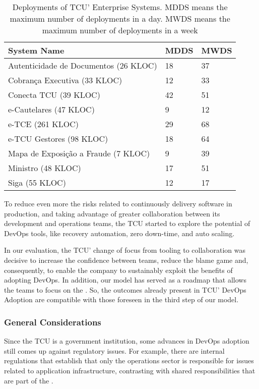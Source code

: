 \begin{table}[hb!]
  \centering
  \begin{small}
\begin{tabular}{p{7cm}p{3cm}p{3cm}} \toprule
{\bf System Name} & {\bf MDDS} & {\bf MWDS} \\ \midrule
Autenticidade de Documentos (26 KLOC) & 18 & 37 \\ 
Cobrança Executiva (33 KLOC) & 12 & 33 \\ 
Conecta TCU (39 KLOC) & 42 & 51 \\ 
e-Cautelares (47 KLOC) & 9 & 12 \\ 
e-TCE (261 KLOC) & 29 & 68 \\ 
e-TCU Gestores (98 KLOC) & 18 & 64 \\ 
Mapa de Exposi\c{c}\~{a}o a Fraude (7 KLOC) & 9 & 39 \\ 
Ministro (48 KLOC) & 17 & 51 \\ 
Siga (55 KLOC) & 12 & 17 \\ \bottomrule
\end{tabular}
\end{small}
  \caption{Deployments of TCU' Enterprise Systems. MDDS means the maximum
    number of deployments in a day. MWDS means the maximum number of deployments
  in a week}
\label{deployments_table}
\end{table}

To reduce even more the risks related to continuously delivery software in
production, and taking advantage of greater collaboration between its development
and operations teams, the TCU started to explore the potential of DevOps tools,
like recovery automation, zero down-time, and auto scaling.

In our evaluation, the TCU' change of focus from tooling to collaboration was
decisive to increase the confidence between teams, reduce the blame game and,
consequently, to enable the company to sustainably exploit the benefits of
adopting DevOps. In addition, our model has served as a roadmap that allows
the teams to focus on the \cc. So, the outcomes already present in TCU' DevOps
Adoption are compatible with those foreseen in the third step of our model.

\subsubsection{General Considerations}
Since the TCU is a government institution, some advances in DevOps adoption
still comes up against regulatory issues. For example, there are internal
regulations that establish that only the operations sector is responsible for
issues related to application infrastructure, contrasting with shared
responsibilities that are part of the \cc.

